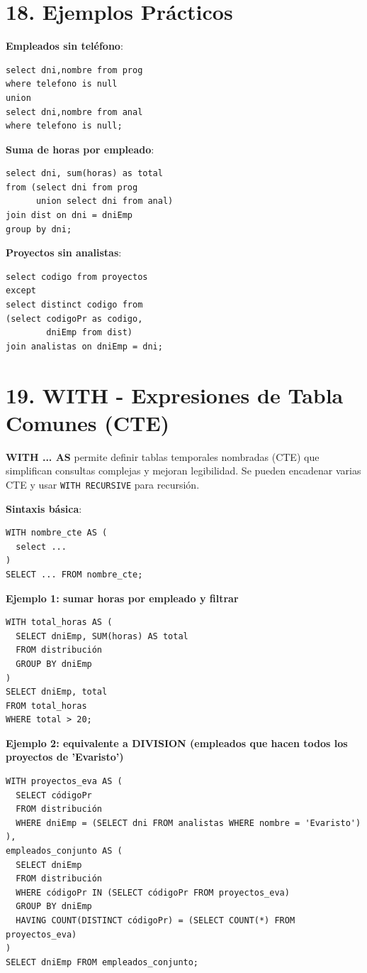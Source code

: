 \documentclass[10pt,a4paper,twocolumn]{article}
\begin{document}
\section*{18. Ejemplos Prácticos}

\textbf{Empleados sin teléfono}:
\begin{lstlisting}
select dni,nombre from prog
where telefono is null
union
select dni,nombre from anal
where telefono is null;
\end{lstlisting}

\textbf{Suma de horas por empleado}:
\begin{lstlisting}
select dni, sum(horas) as total
from (select dni from prog 
      union select dni from anal)
join dist on dni = dniEmp
group by dni;
\end{lstlisting}

\textbf{Proyectos sin analistas}:
\begin{lstlisting}
select codigo from proyectos
except
select distinct codigo from
(select codigoPr as codigo,
        dniEmp from dist)
join analistas on dniEmp = dni;
\end{lstlisting}

\section*{19. WITH - Expresiones de Tabla Comunes (CTE)}

\textbf{WITH ... AS} permite definir tablas temporales nombradas (CTE) que simplifican consultas complejas y mejoran legibilidad. Se pueden encadenar varias CTE y usar \texttt{WITH RECURSIVE} para recursión.

\textbf{Sintaxis básica}:
\begin{lstlisting}
WITH nombre_cte AS (
  select ...
)
SELECT ... FROM nombre_cte;
\end{lstlisting}

\textbf{Ejemplo 1: sumar horas por empleado y filtrar}
\begin{lstlisting}
WITH total_horas AS (
  SELECT dniEmp, SUM(horas) AS total
  FROM distribución
  GROUP BY dniEmp
)
SELECT dniEmp, total
FROM total_horas
WHERE total > 20;
\end{lstlisting}

\textbf{Ejemplo 2: equivalente a DIVISION (empleados que hacen todos los proyectos de 'Evaristo')}
\begin{lstlisting}
WITH proyectos_eva AS (
  SELECT códigoPr
  FROM distribución
  WHERE dniEmp = (SELECT dni FROM analistas WHERE nombre = 'Evaristo')
),
empleados_conjunto AS (
  SELECT dniEmp
  FROM distribución
  WHERE códigoPr IN (SELECT códigoPr FROM proyectos_eva)
  GROUP BY dniEmp
  HAVING COUNT(DISTINCT códigoPr) = (SELECT COUNT(*) FROM proyectos_eva)
)
SELECT dniEmp FROM empleados_conjunto;
\end{lstlisting}
\end{document}
